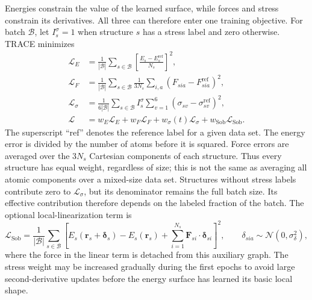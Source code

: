 \documentclass[aps,prx,preprint,notitlepage,superscriptaddress,nofootinbib,floatfix]{revtex4-2}
\newcommand{\calL}{\mathcal{L}}
\newcommand{\vect}[1]{\bm{#1}}
\begin{document}
Energies constrain the value of the learned surface, while
forces and stress constrain its derivatives. All three can therefore enter one
training objective. For batch $\mathcal B$, let $I_s^\sigma=1$ when structure
$s$ has a stress label and zero otherwise. TRACE minimizes
\begin{align}
 \calL_E&=\frac{1}{|\mathcal B|}\sum_{s\in\mathcal B}
 \left[\frac{E_s-E_s^{\mathrm{ref}}}{N_s}\right]^2,\\
 \calL_F&=\frac{1}{|\mathcal B|}\sum_{s\in\mathcal B}
 \frac{1}{3N_s}\sum_{i,a}
 \left(F_{sia}-F_{sia}^{\mathrm{ref}}\right)^2,\\
 \calL_\sigma&=\frac{1}{6|\mathcal B|}
 \sum_{s\in\mathcal B}I_s^\sigma\sum_{v=1}^{6}
 \left(\sigma_{sv}-\sigma_{sv}^{\mathrm{ref}}\right)^2,\\
 \calL&=w_E\calL_E+w_F\calL_F+w_\sigma(t)\calL_\sigma
 +w_{\mathrm{Sob}}\calL_{\mathrm{Sob}}.
 \label{eq:loss}
\end{align}
The superscript ``ref'' denotes the reference label for a
given data set. The energy error is divided by the number of atoms before it is
squared. Force errors are averaged over the $3N_s$ Cartesian components of each
structure. Thus every structure has equal weight, regardless of size; this is
not the same as averaging all atomic components over a mixed-size data set.
Structures without stress labels contribute zero to $\calL_\sigma$, but its
denominator remains the full batch size. Its effective contribution therefore
depends on the labeled fraction of the batch. The optional local-linearization
term is
\begin{equation}
 \calL_{\mathrm{Sob}}=
 \frac{1}{|\mathcal B|}\sum_{s\in\mathcal B}\left[
 E_s(\vect r_s+\vect\delta_s)-E_s(\vect r_s)
 +\sum_{i=1}^{N_s}\vect F_{si}\cdot\vect\delta_{si}
 \right]^2,\qquad
 \delta_{sia}\sim\mathcal N(0,\sigma_\delta^2),
 \label{eq:sobolev}
\end{equation}
where the force in the linear term is detached from this
auxiliary graph. The stress weight may be increased gradually during the first
epochs to avoid large second-derivative updates before the energy surface has
learned its basic local shape.
\end{document}
